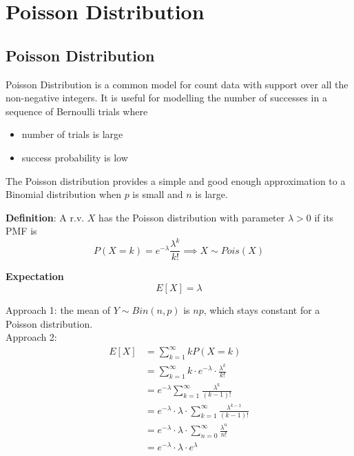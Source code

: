 \chapter{Poisson Distribution}

\section{Poisson Distribution}

Poisson Distribution is a common model for count data with support over all the non-negative integers. It is useful for modelling the number of successes in a sequence of Bernoulli trials where
\begin{itemize}
   \item number of trials is large
   \item success probability is low
\end{itemize}

The Poisson distribution provides a simple and good enough approximation to a Binomial distribution when $p$ is small and $n$ is large. 

\begin{framed}
   \textbf{Definition}: A r.v. $X$ has the Poisson distribution with parameter $\lambda > 0$ if its PMF is
   \[
      P(X = k) = e^{-\lambda} \frac{\lambda^k}{k!} \implies X \sim Pois(X)
   \] 

   \textbf{Expectation}
   \[
      E[X] = \lambda 
   \] 

   Approach 1: the mean of $Y \sim Bin(n, p) $ is  $np $, which stays constant for a Poisson distribution. \\

   Approach 2: 
    \begin{align*}
       E[X] &= \sum_{k = 1}^{\infty} k P(X = k) \\
            &= \sum_{k = 1}^{\infty} k \cdot e^{- \lambda} \cdot \frac{\lambda^k}{k!} \\
            &= e^{-\lambda} \sum_{k = 1}^{\infty} \frac{\lambda^k}{(k-1)!} \\
            &= e^{-\lambda} \cdot \lambda \cdot \sum_{k = 1}^{\infty} \frac{\lambda^{k-1}}{(k-1)!} \\
            &= e^{-\lambda} \cdot \lambda \cdot \sum_{n = 0}^{\infty} \frac{\lambda^n}{ n!} \\
            &= e^{-\lambda } \cdot \lambda \cdot e^{\lambda}
   \end{align*}
   
\end{framed}

